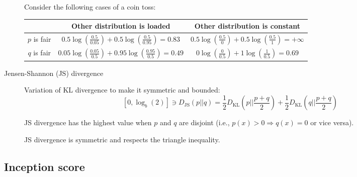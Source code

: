 \begin{description}
        \begin{example}
            Consider the following cases of a coin toss:
            \begin{table}[H]
                \centering
                \begin{tabular}{c|c|c}
                    \toprule
                    & Other distribution is loaded & Other distribution is constant \\
                    \midrule
                    $p$ is fair & 
                        $0.5\log\left(\frac{0.5}{0.05}\right) + 0.5\log\left(\frac{0.5}{0.95}\right) = 0.83$ & 
                        $0.5\log\left(\frac{0.5}{0}\right) + 0.5\log\left(\frac{0.5}{1}\right) = +\infty$ \\
                    $q$ is fair & 
                        $0.05\log\left(\frac{0.05}{0.5}\right) + 0.95\log\left(\frac{0.95}{0.5}\right) = 0.49$ &
                        $0\log\left(\frac{0}{0.5}\right) + 1\log\left(\frac{1}{0.5}\right) = 0.69$ \\
                    \bottomrule
                \end{tabular}
            \end{table}
        \end{example}

    \item[Jensen-Shannon (JS) divergence] 
        Variation of KL divergence to make it symmetric and bounded:
        \[ [0, \log_b(2)] \ni D_\text{JS}(p || q) = \frac{1}{2} D_\text{KL}\left( p || \frac{p+q}{2} \right) + \frac{1}{2} D_\text{KL}\left( q || \frac{p+q}{2} \right) \]

        \begin{remark}
            JS divergence has the highest value when $p$ and $q$ are disjoint (i.e., $p(x) > 0 \Rightarrow q(x) = 0$ or vice versa).
        \end{remark}

        \begin{remark}
            JS divergence is symmetric and respects the triangle inequality.
        \end{remark}
\end{description}


\subsection{Inception score}

